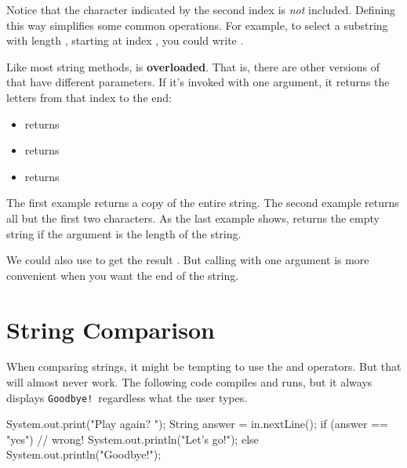 Notice that the character indicated by the second index is {\em not} included.
Defining  this way simplifies some common operations.
For example, to select a substring with length , starting at index , you could write .


Like most string methods,  is {\bf overloaded}.
That is, there are other versions of  that have different parameters.
If it's invoked with one argument, it returns the letters from that index to the end:

\begin{itemize}
\item {} returns 
\item {} returns 
\item {} returns 
\end{itemize}

The first example returns a copy of the entire string.
The second example returns all but the first two characters.
As the last example shows,  returns the empty string if the argument is the length of the string.

We could also use  to get the result .
But calling  with one argument is more convenient when you want the end of the string.


\section{String Comparison}
\label{strcmp}


When comparing strings, it might be tempting to use the \java{==} and \java{!=} operators.
But that will almost never work.
The following code compiles and runs, but it always displays {\tt Goodbye!}\ regardless what the user types.

\begin{code}
System.out.print("Play again? ");
String answer = in.nextLine();
if (answer == "yes") {                 // wrong!
    System.out.println("Let's go!");
} else {
    System.out.println("Goodbye!");
}
\end{code}

